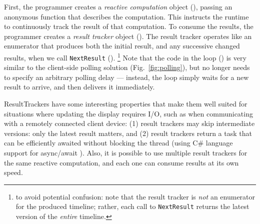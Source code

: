 First, the programmer creates a \emph{reactive computation} object (), passing an anonymous function that describes the computation. This instructs the runtime to continuously track the result of that computation. To consume the results, the programmer creates a \emph{result tracker} object (). The result tracker operates like an enumerator that produces both the initial result, and any successive changed results, when we call \lstinline|NextResult| (). \footnote{to avoid potential confusion: note that the result tracker is \emph{not} an enumerator for the produced timeline; rather, each call to \lstinline|NextResult| returns the latest version of the \emph{entire} timeline.}
Note that the code in the loop () is very similar to the client-side polling solution (Fig.~\ref{fig:polling}), but no longer needs to specify an arbitrary polling delay --- instead, the loop simply waits for a new result to arrive, and then delivers it immediately.

ResultTrackers have some interesting properties that make them well suited for situations where updating the display requires I/O, such as when communicating with a remotely connected client device:   (1) result trackers may skip intermediate versions: only the latest result matters, and (2) result trackers return a task that can be efficiently awaited without blocking the thread (using C\# language support for async/await \cite{Bierman2012}).  Also, it is possible to use multiple result trackers for the same reactive computation, and each one can consume results at its own speed.


 




